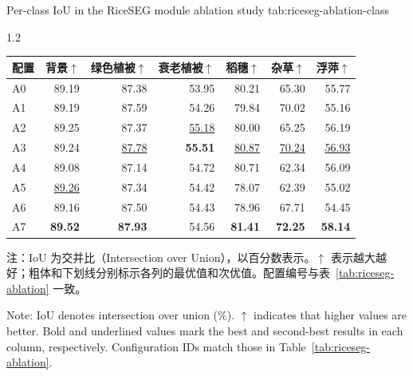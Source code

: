 \begin{table}[!htb]
  \centering
    {Per-class IoU in the RiceSEG module ablation study}
    {tab:riceseg-ablation-class}
  \begin{spacing}{1.2}
    \small
    \setlength{\tabcolsep}{3pt}
    \renewcommand{\arraystretch}{1.15}
    \begin{tabular*}{\linewidth}{@{\extracolsep{\fill}}lrrrrrr@{}}
      \toprule
      配置 & 背景\(\uparrow\) & 绿色植被\(\uparrow\) & 衰老植被\(\uparrow\)
        & 稻穗\(\uparrow\) & 杂草\(\uparrow\) & 浮萍\(\uparrow\) \\
      \midrule
      A0 & 89.19 & 87.38 & 53.95 & 80.21 & 65.30 & 55.77 \\
      A1 & 89.19 & 87.59 & 54.26 & 79.84 & 70.02 & 55.16 \\
      A2 & 89.25 & 87.37 & \underline{55.18} & 80.00 & 65.25 & 56.19 \\
      A3 & 89.24 & \underline{87.78} & \textbf{55.51}
        & \underline{80.87} & \underline{70.24} & \underline{56.93} \\
      A4 & 89.08 & 87.14 & 54.72 & 80.71 & 62.34 & 56.09 \\
      A5 & \underline{89.26} & 87.34 & 54.42 & 78.07 & 62.39 & 55.02 \\
      A6 & 89.16 & 87.50 & 54.43 & 78.96 & 67.71 & 54.45 \\
      \midrule
      A7 & \textbf{89.52} & \textbf{87.93} & 54.56
        & \textbf{81.41} & \textbf{72.25} & \textbf{58.14} \\
      \bottomrule
    \end{tabular*}
  \end{spacing}
  \par\vspace{8pt}
  \noindent\begin{minipage}{\linewidth}
    \normalfont{}\raggedright
    \noindent 注：IoU 为交并比（Intersection over Union），以百分数表示。\(\uparrow\) 表示越大越好；粗体和下划线分别标示各列的最优值和次优值。配置编号与表~\ref{tab:riceseg-ablation} 一致。\par
    \vspace{2pt}
    \noindent Note: IoU denotes intersection over union (\%). \(\uparrow\) indicates that higher values are better. Bold and underlined values mark the best and second-best results in each column, respectively. Configuration IDs match those in Table~\ref{tab:riceseg-ablation}.\par
  \end{minipage}\par
\end{table}

